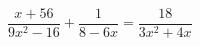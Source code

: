 \begin{ex}[type=equation]
	\begin{condition}
		$\dfrac{x + 56}{9x^2 - 16} + \dfrac{1}{8 - 6x} = \dfrac{18}{3x^2 + 4x}$
	\end{condition}
\end{ex}